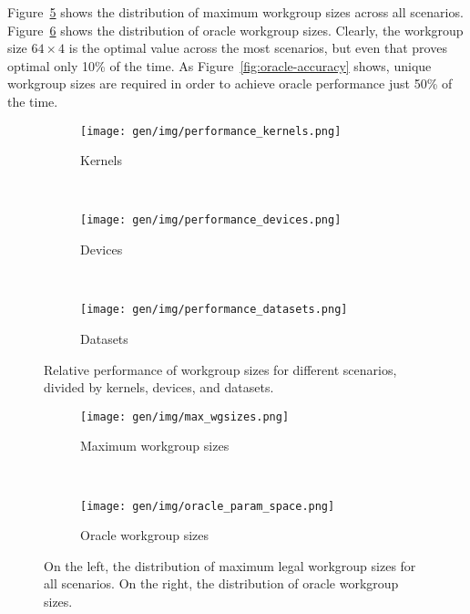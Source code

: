 Figure~\ref{fig:max-wgsizes} shows the distribution of maximum
workgroup sizes across all scenarios. Figure~\ref{fig:oracle-wgsizes}
shows the distribution of oracle workgroup sizes. Clearly, the
workgroup size $64 \times 4$ is the optimal value across the most
scenarios, but even that proves optimal only 10\% of the time. As
Figure~\ref{fig:oracle-accuracy} shows,
 unique workgroup sizes are
required in order to achieve oracle performance just 50\% of the time.


\begin{figure}
\begin{subfigure}[t]{0.32\textwidth}
\centering
\texttt{[image: gen/img/performance\_kernels.png]}
\vspace{-1.5em} %
\caption{Kernels}
\label{fig:performance-kernels}
\end{subfigure}
~%
\begin{subfigure}[t]{0.32\textwidth}
\centering
\texttt{[image: gen/img/performance\_devices.png]}
\vspace{-1.5em} %
\caption{Devices}
\label{fig:performance-devices}
\end{subfigure}
~%
\begin{subfigure}[t]{0.32\textwidth}
\centering
\texttt{[image: gen/img/performance\_datasets.png]}
\vspace{-1.5em} %
\caption{Datasets}
\label{fig:performance-datasets}
\end{subfigure}
\label{fig:performance}
\caption{%
  Relative performance of workgroup sizes for different
  scenarios, divided by kernels, devices, and datasets.%
}
\end{figure}

\begin{figure}
\begin{subfigure}[t]{0.45\textwidth}
\centering
\texttt{[image: gen/img/max\_wgsizes.png]}
\vspace{-1.5em} %
\caption{Maximum workgroup sizes}
\label{fig:max-wgsizes}
\end{subfigure}
~%
\begin{subfigure}[t]{0.45\textwidth}
\centering
\texttt{[image: gen/img/oracle\_param\_space.png]}
\vspace{-1.5em} %
\caption{Oracle workgroup sizes}
\label{fig:oracle-wgsizes}
\end{subfigure}
\caption{%
  On the left, the distribution of maximum legal workgroup sizes for
  all scenarios. On the right, the distribution of oracle workgroup
  sizes.%
}
\label{fig:heatmaps}
\end{figure}

